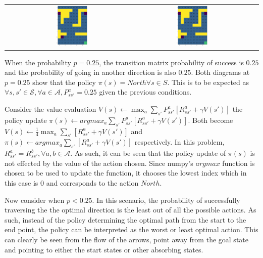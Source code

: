 \begin{center}
\begin{tabular}{c | c  c  c}
        & 
            \includegraphics[width=0.28\textwidth]{assets/dp/analysis/prob_0.25_gamma_0.8_value.png}
        &
            \includegraphics[width=0.28\textwidth]{assets/dp/analysis/prob_0.5_gamma_0.8_value.png}
    \end{tabular}        
\end{center}

When the probability $p = 0.25$, the transition matrix probability
of success is $0.25$ and the probability of going in another direction
is also $0.25$.
Both diagrams at $p = 0.25$ show that the policy $\pi(s) = North \forall s \in S$.
This is to be expected as
$ \forall s, s' \in \mathcal{S}, \forall a \in \mathcal{A}, P^a_{ss'} = 0.25$ given 
the previous conditions. 

Consider the value evaluation 
$V(s) \leftarrow \max_a \sum_{s'} P^a_{ss'}[R^a_{ss'} + \gamma V(s')]$
the policy update $\pi(s) \leftarrow argmax_a \sum_{s'} P^a_{ss'}[R^a_{ss'} + \gamma V(s')]$.
Both become $V(s) \leftarrow \frac{1}{4}\max_a \sum_{s'} [R^a_{ss'} + \gamma V(s')]$
and $\pi(s) \leftarrow argmax_a \sum_{s'} [R^a_{ss'} + \gamma V(s')]$
respectively.
In this problem, $R^a_{ss'} = R^b_{ss'}, \forall a, b \in \mathcal{A}$. 
As such, it can be seen that the policy update of $\pi(s)$ is 
not effected by the value of the action chosen. Since numpy's
$argmax$ function is chosen to be used to update the function, 
it chooses the lowest index which in this case is $0$ and corresponds
to the action $North$. 

Now consider when $p < 0.25$.
In this scenario, the probability of successfully traversing the the
optimal direction is the least out of all the possible actions.
As such, instead of the policy determining the optimal path from the
start to the end point, the policy can be interpreted as the worst
or least optimal action. This can clearly be seen from the flow 
of the arrows, point away from the goal state and pointing to either
the start states or other absorbing states. 


